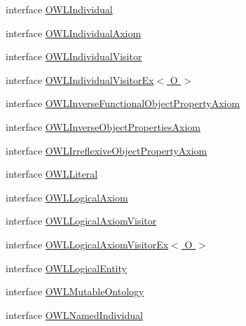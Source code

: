 \begin{DoxyCompactItemize}
\item 
interface \hyperlink{interfaceorg_1_1semanticweb_1_1owlapi_1_1model_1_1_o_w_l_individual}{O\-W\-L\-Individual}
\item 
interface \hyperlink{interfaceorg_1_1semanticweb_1_1owlapi_1_1model_1_1_o_w_l_individual_axiom}{O\-W\-L\-Individual\-Axiom}
\item 
interface \hyperlink{interfaceorg_1_1semanticweb_1_1owlapi_1_1model_1_1_o_w_l_individual_visitor}{O\-W\-L\-Individual\-Visitor}
\item 
interface \hyperlink{interfaceorg_1_1semanticweb_1_1owlapi_1_1model_1_1_o_w_l_individual_visitor_ex_3_01_o_01_4}{O\-W\-L\-Individual\-Visitor\-Ex$<$ O $>$}
\item 
interface \hyperlink{interfaceorg_1_1semanticweb_1_1owlapi_1_1model_1_1_o_w_l_inverse_functional_object_property_axiom}{O\-W\-L\-Inverse\-Functional\-Object\-Property\-Axiom}
\item 
interface \hyperlink{interfaceorg_1_1semanticweb_1_1owlapi_1_1model_1_1_o_w_l_inverse_object_properties_axiom}{O\-W\-L\-Inverse\-Object\-Properties\-Axiom}
\item 
interface \hyperlink{interfaceorg_1_1semanticweb_1_1owlapi_1_1model_1_1_o_w_l_irreflexive_object_property_axiom}{O\-W\-L\-Irreflexive\-Object\-Property\-Axiom}
\item 
interface \hyperlink{interfaceorg_1_1semanticweb_1_1owlapi_1_1model_1_1_o_w_l_literal}{O\-W\-L\-Literal}
\item 
interface \hyperlink{interfaceorg_1_1semanticweb_1_1owlapi_1_1model_1_1_o_w_l_logical_axiom}{O\-W\-L\-Logical\-Axiom}
\item 
interface \hyperlink{interfaceorg_1_1semanticweb_1_1owlapi_1_1model_1_1_o_w_l_logical_axiom_visitor}{O\-W\-L\-Logical\-Axiom\-Visitor}
\item 
interface \hyperlink{interfaceorg_1_1semanticweb_1_1owlapi_1_1model_1_1_o_w_l_logical_axiom_visitor_ex_3_01_o_01_4}{O\-W\-L\-Logical\-Axiom\-Visitor\-Ex$<$ O $>$}
\item 
interface \hyperlink{interfaceorg_1_1semanticweb_1_1owlapi_1_1model_1_1_o_w_l_logical_entity}{O\-W\-L\-Logical\-Entity}
\item 
interface \hyperlink{interfaceorg_1_1semanticweb_1_1owlapi_1_1model_1_1_o_w_l_mutable_ontology}{O\-W\-L\-Mutable\-Ontology}
\item 
interface \hyperlink{interfaceorg_1_1semanticweb_1_1owlapi_1_1model_1_1_o_w_l_named_individual}{O\-W\-L\-Named\-Individual}
\item 

\end{DoxyCompactItemize}
